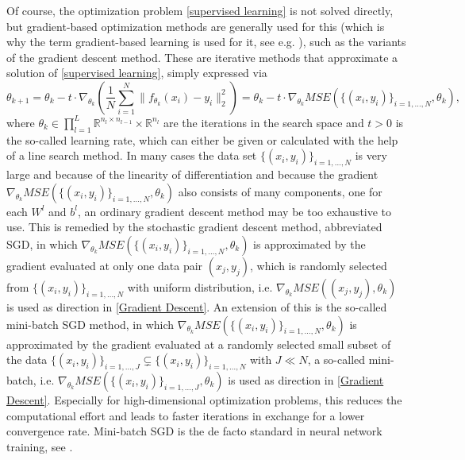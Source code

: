 Of course, the optimization problem \cref{supervised learning} is not solved directly, but gradient-based optimization methods are generally used for this (which is why the term gradient-based learning is used for it, see e.g. \cite[p.~177]{GoodfellowBengioCourville:2016}), such as the variants of the gradient descent method. These are iterative methods that approximate a solution of \cref{supervised learning}, simply expressed via 
\begin{equation}
    \label{Gradient Descent}
    \theta_{k+1} = \theta_k - t \cdot \nabla_{\theta_k} \left( \frac{1}{N}\sum_{i=1}^{N} \lVert f_{\theta_k} \left(x_{i}\right) - y_{i}\rVert^{2}_2 \right) = \theta_k - t \cdot \nabla_{\theta_k} MSE(\{ (x_i, y_i) \}_{i = 1, \ldots, N}, \theta_k),
\end{equation}
where $\theta_k \in \prod^L_{l=1}  \mathbb{R}^{n_l \times n_{l-1}} \times \mathbb{R}^{n_l}$ are the iterations in the search space and $t > 0$ is the so-called learning rate, which can either be given or calculated with the help of a line search method. In many cases the data set $\{ (x_i, y_i) \}_{i = 1, \ldots, N}$ is very large and because of the linearity of differentiation and because the gradient $\nabla_{\theta_k} MSE(\{ (x_i, y_i) \}_{i = 1, \ldots, N}, \theta_k)$ also consists of many components, one for each $W^l$ and $b^l$, an ordinary gradient descent method may be too exhaustive to use. This is remedied by the stochastic gradient descent method, abbreviated SGD, in which $\nabla_{\theta_k} MSE(\{ (x_i, y_i) \}_{i = 1, \ldots, N}, \theta_k)$ is approximated by the gradient evaluated at only one data pair $(x_j, y_j)$, which is randomly selected from $\{ (x_i, y_i) \}_{i = 1, \ldots, N}$ with uniform distribution, i.e. $\nabla_{\theta_k} MSE((x_j, y_j), \theta_k)$ is used as direction in \cref{Gradient Descent}. An extension of this is the so-called mini-batch SGD method, in which $\nabla_{\theta_k} MSE(\{ (x_i, y_i) \}_{i = 1, \ldots, N}, \theta_k)$ is approximated by the gradient evaluated at a randomly selected small subset  of the data $\{ (x_i, y_i) \}_{i = 1, \ldots, J} \subsetneq  \{ (x_i, y_i) \}_{i = 1, \ldots, N}$ with $J \ll N$, a so-called mini-batch, i.e. $\nabla_{\theta_k} MSE(\{ (x_i, y_i) \}_{i = 1, \ldots, J}, \theta_k)$ is used as direction in \cref{Gradient Descent}. Especially for high-dimensional optimization problems, this reduces the computational effort and leads to faster iterations in exchange for a lower convergence rate. Mini-batch SGD is the de facto standard in neural network training, see \cite[sections~5.9~+~8.3.1]{GoodfellowBengioCourville:2016}. \\
